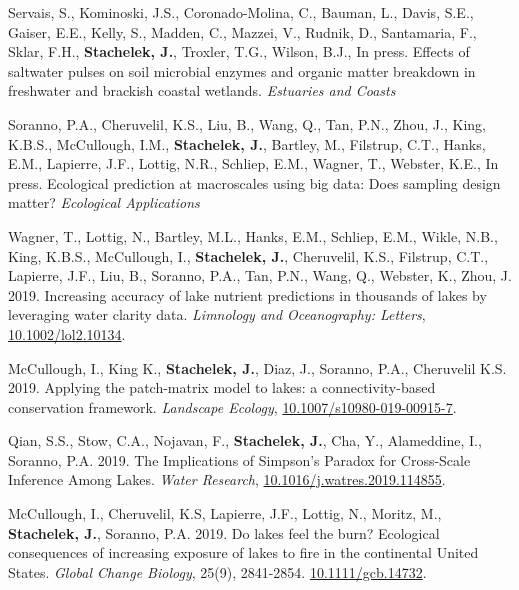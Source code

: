 \documentclass[11pt]{article}
\makeatletter
\newlength{\bibhang}
\newlength{\bibsep}
 {\@listi \global\bibsep\itemsep \global\advance\bibsep by\parsep}
\newenvironment{bibenum*}
  {\renewcommand\labelenumi{[\theenumi]}%
   \etaremune[
     topsep=0pt,
     itemsep=\bibsep,
     parsep=0pt,partopsep=0pt,
     itemindent=-\bibhang,
     leftmargin={\bibhang+\widthof{[999]}}]}
  {\endetaremune}
\makeatother
\begin{document}
\begin{bibenum*}

\item Servais, S., Kominoski, J.S., Coronado-Molina, C., Bauman, L., Davis, S.E., Gaiser, E.E., Kelly, S., Madden, C., Mazzei, V., Rudnik, D., Santamaria, F., Sklar, F.H., \textbf{Stachelek, J.}, Troxler, T.G., Wilson, B.J., In press. Effects of saltwater pulses on soil microbial enzymes and organic matter breakdown in freshwater and brackish coastal wetlands. \emph{Estuaries and Coasts}

\item Soranno, P.A., Cheruvelil, K.S., Liu, B., Wang, Q., Tan, P.N., Zhou, J., King, K.B.S., McCullough, I.M., \textbf{Stachelek, J.}, Bartley, M., Filstrup, C.T., Hanks, E.M., Lapierre, J.F., Lottig, N.R., Schliep, E.M., Wagner, T., Webster, K.E., In press. Ecological prediction at macroscales using big data: Does sampling design matter? \emph{Ecological Applications}

\item Wagner, T., Lottig, N., Bartley, M.L., Hanks, E.M., Schliep, E.M., Wikle, N.B., King, K.B.S., McCullough, I., \textbf{Stachelek, J.}, Cheruvelil, K.S., Filstrup, C.T., Lapierre, J.F., Liu, B., Soranno, P.A., Tan, P.N., Wang, Q., Webster, K.,  Zhou, J. 2019. Increasing accuracy of lake nutrient predictions in thousands of lakes by leveraging water clarity data. \emph{Limnology and Oceanography: Letters}, \href{https://doi.org/10.1002/lol2.10134}{10.1002/lol2.10134}. 

\item McCullough, I., King K., \textbf{Stachelek, J.}, Diaz, J., Soranno, P.A., Cheruvelil K.S. 2019. Applying the patch-matrix model to lakes: a connectivity-based conservation framework. \emph{Landscape Ecology}, \href{https://doi.org/10.1007/s10980-019-00915-7}{10.1007/s10980-019-00915-7}.

\item Qian, S.S., Stow, C.A., Nojavan, F., \textbf{Stachelek, J.}, Cha, Y., Alameddine, I., Soranno, P.A. 2019. The Implications of Simpson's Paradox for Cross-Scale Inference Among Lakes. \emph{Water Research}, \href{https://doi.org/10.1016/j.watres.2019.114855}{10.1016/j.watres.2019.114855}.

\item McCullough, I., Cheruvelil, K.S, Lapierre, J.F., Lottig, N., Moritz, M., \textbf{Stachelek, J.}, Soranno, P.A. 2019. Do lakes feel the burn? Ecological consequences of increasing exposure of lakes to fire in the continental United States. \emph{Global Change Biology}, 25(9), 2841-2854. \href{https://doi.org/10.1111/gcb.14732}{10.1111/gcb.14732}.


\end{bibenum*}
\end{document}

